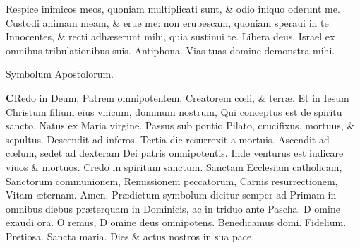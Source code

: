 \documentclass[a5paper,10pt]{book}
\def\ae{æ}
\def\oe{œ}
\begin{document}
\begin{multicols*}{2}
\newline \color{red} R\color{black}espice inimicos meos, quoniam multiplicati sunt, \& odio iniquo oderunt me.
\newline \color{red} C\color{black}ustodi animam meam, \& erue me: non erubescam, quoniam speraui in te%
\newline \color{red} I\color{black}nnocentes, \& recti adh\ae serunt mihi, quia sustinui te.
\newline \color{red} L\color{black}ibera deus, Israel ex omnibus tribulationibus suis. \quad \color{red} Antiphona. \color{black} Vias tuas domine demonstra mihi. \color{black}
\vspace{-1em}
\begin{center} \color{red}
Symbolum Apostolorum.
\end{center}
\vspace{-1em}
\lettrine[lines=2]{\bfseries \color{red} C}{}Redo in Deum, 
\color{red} P\color{black}atrem omnipotentem,
\color{red} C\color{black}reatorem c\oe li, \& terr\ae .
\color{red} E\color{black}t in Iesum Christum filium eius vnicum, dominum nostrum,
\color{red} Q\color{black}ui conceptus est de spiritu sancto.
\color{red} N\color{black}atus ex Maria virgine.
\color{red} P\color{black}assus sub pontio Pilato, crucifixus, mortuus, \& sepultus.
\color{red} D\color{black}escendit ad inferos.
\color{red} T\color{black}ertia die resurrexit a mortuis.
\color{red} A\color{black}scendit ad c\oe lum, sedet ad dexteram Dei patris omnipotentis.
\color{red} I\color{black}nde venturus est iudicare viuos \& mortuos.
\newline \color{red} C\color{black}redo in spiritum sanctum.
\newline \color{red} S\color{black}anctam Ecclesiam catholicam,
\newline \color{red} S\color{black}anctorum communionem,
\newline \color{red} R\color{black}emissionem peccatorum,
\newline \color{red} C\color{black}arnis resurrectionem,
\newline \color{red} V\color{black}itam \ae ternam. Amen.
\newline {} \color{red} Pr\ae dictum symbolum dicitur semper ad Primam in omnibus diebus pr\ae terquam in Dominicis, ac in triduo ante Pascha. \color{black}
\newline \color{red} D\color{black} omine exaudi ora. \color{red} O\color{black} remus, \color{red} D\color{black} omine deus omnipotens. Benedicamus domi. Fidelium. Pretiosa. Sancta maria. Dies \& actus nostros in sua pace.

\end{multicols*}
\end{document}
